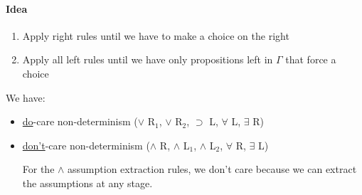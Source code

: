 \documentclass[12 pt]{article}
\begin{document}
         \paragraph{Idea}
         \begin{enumerate}
         \item Apply right rules until we have to make a choice on the
           right
         \item Apply all left rules until we have only propositions
           left in $\Gamma$ that force a choice
         \end{enumerate}
         We have:
         \begin{itemize}
         \item 
         \underline{do}-care non-determinism ($\lor$ R$_1$, $\lor$
         R$_2$, $\supset$ L, $\forall$ L, $\exists$ R)
         \item 
         \underline{don't}-care non-determinism ($\land $ R, $\land$
         L$_1$, $\land$ L$_2$, $\forall$ R, $\exists$ L)

         For the $\land$ assumption extraction rules, we don't care
         because we can extract the assumptions at any stage.
       \end{itemize}
\end{document}
